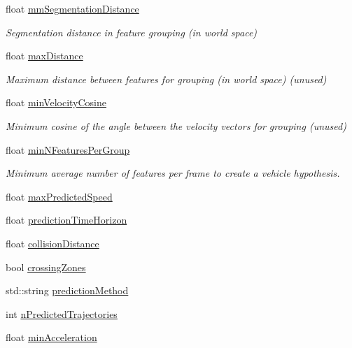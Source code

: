 \begin{DoxyCompactItemize}
float \hyperlink{structKLTFeatureTrackingParameters_a2cf9367a2414ead952228bed67339e7c}{mm\-Segmentation\-Distance}
\begin{DoxyCompactList}\small\item\em Segmentation distance in feature grouping (in world space) \end{DoxyCompactList}\item 
float \hyperlink{structKLTFeatureTrackingParameters_aa4870c94cfe88eb27b0b7bb75f6fed23}{max\-Distance}
\begin{DoxyCompactList}\small\item\em Maximum distance between features for grouping (in world space) (unused) \end{DoxyCompactList}\item 
float \hyperlink{structKLTFeatureTrackingParameters_a21ffaaa5b36521d31550438b6248b48d}{min\-Velocity\-Cosine}
\begin{DoxyCompactList}\small\item\em Minimum cosine of the angle between the velocity vectors for grouping (unused) \end{DoxyCompactList}\item 
float \hyperlink{structKLTFeatureTrackingParameters_a566bca052479db63d09155290e1e9106}{min\-N\-Features\-Per\-Group}
\begin{DoxyCompactList}\small\item\em Minimum average number of features per frame to create a vehicle hypothesis. \end{DoxyCompactList}\item 
float \hyperlink{structKLTFeatureTrackingParameters_ab363db8735a2d3f182e6d7c634b1cbf9}{max\-Predicted\-Speed}
\item 
float \hyperlink{structKLTFeatureTrackingParameters_adab4df4e7e0cbc6832ccf3380ddfa4f3}{prediction\-Time\-Horizon}
\item 
float \hyperlink{structKLTFeatureTrackingParameters_a79642a411853fb5eb8b17a190c80be26}{collision\-Distance}
\item 
bool \hyperlink{structKLTFeatureTrackingParameters_a6882da3735cb71f000283f2be17de08f}{crossing\-Zones}
\item 
std\-::string \hyperlink{structKLTFeatureTrackingParameters_a859980b7c56fab3a0a078a0b00290633}{prediction\-Method}
\item 
int \hyperlink{structKLTFeatureTrackingParameters_aeccd47f27aba6c9eafde449ee906431e}{n\-Predicted\-Trajectories}
\item 
float \hyperlink{structKLTFeatureTrackingParameters_a2f4e1ea73d5647a9b1a31c4aa2c7d829}{min\-Acceleration}

\end{DoxyCompactItemize}
